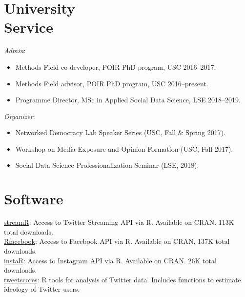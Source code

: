 \documentclass[margin,line,11pt]{resume}
\newcommand{\nl}{\vspace{0.10in}\\}
\begin{document}
\begin{resume}
                \section{\mysidestyle University\\Service}
                
\emph{Admin}: 
\begin{itemize}
\item Methods Field co-developer, POIR PhD program, USC 2016--2017.
\item Methods Field advisor, POIR PhD program, USC 2016--present.
\item Programme Director, MSc in Applied Social Data Science, LSE 2018--2019.
\end{itemize}
\emph{Organizer}: 
\begin{itemize}
\item Networked Democracy Lab Speaker Series (USC, Fall \& Spring 2017).
\item Workshop on Media Exposure and Opinion Formation (USC, Fall 2017).
\item Social Data Science Professionalization Seminar (LSE, 2018).
\end{itemize}





    
        \section{\mysidestyle Software}
    
\href{http://cran.r-project.org/web/packages/streamR/}{streamR}: Access to Twitter Streaming API via R. Available on CRAN. 113K total downloads. \nl
\href{http://cran.r-project.org/web/packages/Rfacebook/index.html}{Rfacebook}: Access to Facebook API via R. Available on CRAN. 137K total downloads.\nl
\href{http://cran.r-project.org/web/packages/instaR/index.html}{instaR}: Access to Instagram API via R. Available on CRAN. 26K total downloads. \nl
\href{http://www.tweetscores.com}{tweetscores}: R tools for analysis of Twitter data. Includes functions to estimate ideology of Twitter users.



\end{resume}
\end{document}
